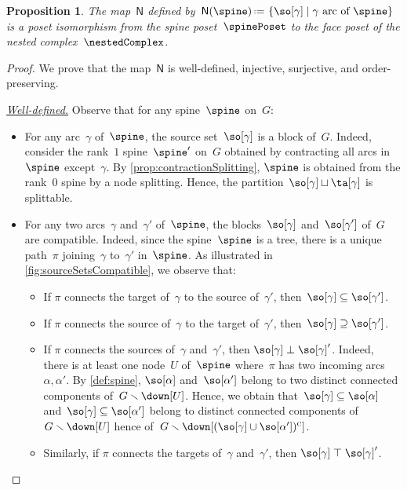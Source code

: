 \documentclass{amsart}
\newtheorem{proposition}[theorem]{Proposition}
\theoremstyle{definition}
\newcommand{\set}[2]{\left\{ #1 \;\middle|\; #2 \right\}} %
\newcommand{\ssm}{\smallsetminus} %
\newcommand{\eqdef}{\mbox{\,\raisebox{0.2ex}{\scriptsize\ensuremath{\mathrm:}}\ensuremath{=}\,}} %
\newcommand{\para}[1]{\medskip\noindent\uline{\textit{#1.}}} %
\newcommand{\vincent}[1]{\todo[color=blue!30]{#1 \\ \hfill --- V.}}
\newcommand{\negDisjoint}{\perp} %
\newcommand{\posDisjoint}{\;\top\;} %
\newcommand{\compl}[1]{#1{}^\textsc{c}} %
\newcommand{\spineToNested}{\mathsf{N}} %
\begin{document}
\begin{proposition}
  \label{prop:spineToNested}
  The map~$\spineToNested$ defined by~$\spineToNested(\spine) \eqdef \set{\so[\gamma]}{\gamma \text{ arc of } \spine}$ is a poset isomorphism from the spine poset~$\spinePoset$ to the face poset of the nested complex~$\nestedComplex$.
\end{proposition}

\begin{proof}
  We prove that the map~$\spineToNested$ is well-defined, injective, surjective, and order-preserving.
  
  \para{Well-defined}
  Observe that for any spine~$\spine$ on~$G$:
  \begin{itemize}
    \item For any arc~$\gamma$ of~$\spine$, the source set~$\so[\gamma]$ is a block of~$G$. 
    Indeed, consider the rank~$1$ spine~$\spine'$ on~$G$ obtained by contracting all arcs in~$\spine$ except~$\gamma$. 
    By \cref{prop:contractionSplitting}, $\spine$ is obtained from the rank~$0$ spine by a node splitting. 
    Hence, the partition~$\so[\gamma] \sqcup \ta[\gamma]$ is splittable.
    \item For any two arcs~$\gamma$ and~$\gamma'$ of~$\spine$, the blocks~$\so[\gamma]$ and~$\so[\gamma']$ of~$G$ are compatible. 
    Indeed, since the spine~$\spine$ is a tree, there is a unique path~$\pi$ joining~$\gamma$ to~$\gamma'$ in~$\spine$.
    As illustrated in \cref{fig:sourceSetsCompatible}, we observe that:
    \vincent{borrow picture...}
    \begin{itemize}
      \item If $\pi$ connects the target of~$\gamma$ to the source of~$\gamma'$, then~$\so[\gamma] \subseteq \so[\gamma']$.
      \item If $\pi$ connects the source of~$\gamma$ to the target of~$\gamma'$, then~$\so[\gamma] \supseteq \so[\gamma']$.
      \item If $\pi$ connects the sources of~$\gamma$ and~$\gamma'$, then $\so[\gamma] \negDisjoint \so[\gamma]'$.
      Indeed, there is at least one node~$U$ of~$\spine$ where~$\pi$ has two incoming arcs~$\alpha, \alpha'$.
      By \cref{def:spine}, $\so[\alpha]$ and~$\so[\alpha']$ belong to two distinct connected components of~$G \ssm \down[U]$.
      Hence, we obtain that~$\so[\gamma] \subseteq \so[\alpha]$ and~$\so[\gamma] \subseteq \so[\alpha']$ belong to distinct connected components of~$G \ssm \down[U]$ hence of~$G \ssm \down[\compl{(\so[\gamma] \cup \so[\alpha'])}]$.
      \item Similarly, if $\pi$ connects the targets of~$\gamma$ and~$\gamma'$, then $\so[\gamma] \posDisjoint \so[\gamma]'$.
    \end{itemize}
  \end{itemize}


\end{proof}
\end{document}
